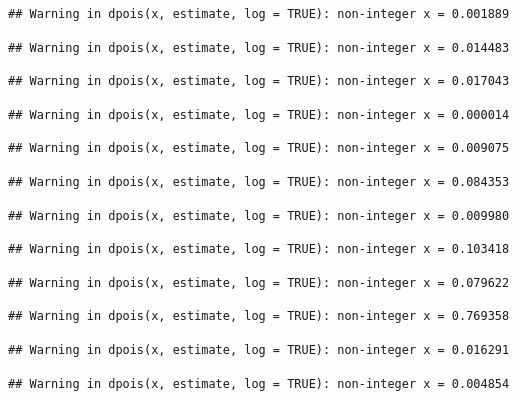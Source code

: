 \documentclass[]{article}
\begin{document}
\begin{verbatim}
## Warning in dpois(x, estimate, log = TRUE): non-integer x = 0.001889
\end{verbatim}

\begin{verbatim}
## Warning in dpois(x, estimate, log = TRUE): non-integer x = 0.014483
\end{verbatim}

\begin{verbatim}
## Warning in dpois(x, estimate, log = TRUE): non-integer x = 0.017043
\end{verbatim}

\begin{verbatim}
## Warning in dpois(x, estimate, log = TRUE): non-integer x = 0.000014
\end{verbatim}

\begin{verbatim}
## Warning in dpois(x, estimate, log = TRUE): non-integer x = 0.009075
\end{verbatim}

\begin{verbatim}
## Warning in dpois(x, estimate, log = TRUE): non-integer x = 0.084353
\end{verbatim}

\begin{verbatim}
## Warning in dpois(x, estimate, log = TRUE): non-integer x = 0.009980
\end{verbatim}

\begin{verbatim}
## Warning in dpois(x, estimate, log = TRUE): non-integer x = 0.103418
\end{verbatim}

\begin{verbatim}
## Warning in dpois(x, estimate, log = TRUE): non-integer x = 0.079622
\end{verbatim}

\begin{verbatim}
## Warning in dpois(x, estimate, log = TRUE): non-integer x = 0.769358
\end{verbatim}

\begin{verbatim}
## Warning in dpois(x, estimate, log = TRUE): non-integer x = 0.016291
\end{verbatim}

\begin{verbatim}
## Warning in dpois(x, estimate, log = TRUE): non-integer x = 0.004854
\end{verbatim}
\end{document}
